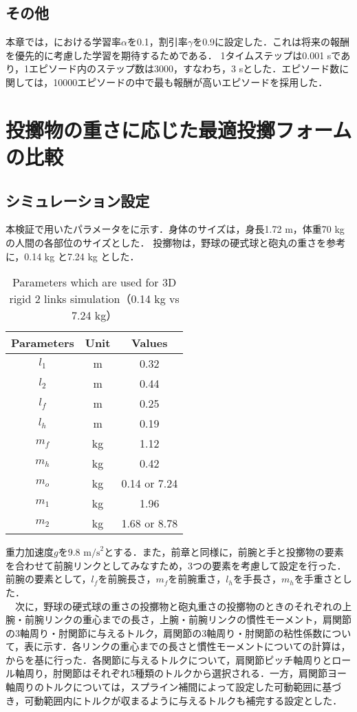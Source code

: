 \subsection{その他}
本章では，における学習率$\alpha$を0.1，割引率$\gamma$を0.9に設定した．これは将来の報酬を優先的に考慮した学習を期待するためである．
1タイムステップは0.001 sであり，1エピソード内のステップ数は3000，すなわち，3 sとした．エピソード数に関しては，10000エピソードの中で最も報酬が高いエピソードを採用した．

\section{投擲物の重さに応じた最適投擲フォームの比較}
\subsection{シミュレーション設定}
本検証で用いたパラメータをに示す．身体のサイズは，身長1.72 m，体重70 kgの人間の各部位のサイズとした．
投擲物は，野球の硬式球と砲丸の重さを参考に，0.14 kg と7.24 kg とした．
\begin{table}[tb]
  \begin{center}
    \caption{Parameters which are used for 3D rigid 2 links simulation（0.14 kg vs 7.24 kg）}
    \begin{tabular}{c|c|c}
      \hline
      Parameters & Unit & Values \\
      \hline
      $l_{1}$ & m & 0.32 \\
      $l_{2}$ & m & 0.44 \\
      $l_{f}$ & m & 0.25 \\
      $l_{h}$ & m & 0.19 \\
      $m_{f}$ & kg & 1.12 \\
      $m_{h}$ & kg & 0.42 \\
      $m_{o}$ & kg & 0.14 or 7.24 \\
      $m_{1}$ & kg & 1.96 \\
      $m_{2}$ & kg & 1.68 or 8.78 \\
      \hline
    \end{tabular}
  \end{center}
\end{table}
重力加速度$g$を9.8 $\mathrm{m/s}^{2}$とする．また，前章と同様に，前腕と手と投擲物の要素を合わせて前腕リンクとしてみなすため，3つの要素を考慮して設定を行った．
前腕の要素として，$l_{f}$を前腕長さ，$m_{f}$を前腕重さ，$l_{h}$を手長さ，$m_{h}$を手重さとした．\\
　次に，野球の硬式球の重さの投擲物と砲丸重さの投擲物のときのそれぞれの上腕・前腕リンクの重心までの長さ，上腕・前腕リンクの慣性モーメント，肩関節の3軸周り・肘関節に与えるトルク，肩関節の3軸周り・肘関節の粘性係数について，表に示す．各リンクの重心までの長さと慣性モーメントについての計算は，からを基に行った．各関節に与えるトルクについて，肩関節ピッチ軸周りとロール軸周り，肘関節はそれぞれ5種類のトルクから選択される．一方，肩関節ヨー軸周りのトルクについては，スプライン補間によって設定した可動範囲に基づき，可動範囲内にトルクが収まるように与えるトルクも補完する設定とした．

